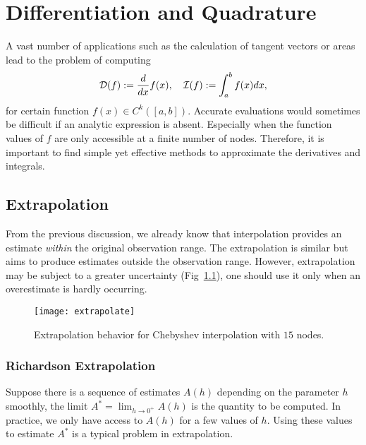 \chapter{Differentiation and Quadrature}
\label{Ch: 3-Dif-Qua}
A vast number of applications such as the calculation of tangent vectors or areas lead to the problem of computing 
\begin{equation}
    \mathcal D(f) := \frac{d}{dx} f(x),\quad \mathcal I(f) := \int_a^b f(x) dx, 
\end{equation}
for certain function $f(x)\in C^k([a, b])$. Accurate evaluations would sometimes be difficult if an analytic expression is absent. Especially when the function values of $f$ are only accessible at a finite number of nodes. Therefore, it is important to find simple yet effective methods to approximate the derivatives and integrals. 

\section{Extrapolation}
\label{Sec: 3-Ext}
From the previous discussion, we already know that interpolation provides an estimate \emph{within} the original observation range. The extrapolation is similar but aims to produce estimates outside the observation range. However, extrapolation may be subject to a greater uncertainty (Fig~\ref{FIG: EXTRAPO}), one should use it only when an overestimate is hardly occurring.
\begin{figure}[!htb]
    \centering
    \texttt{[image: extrapolate]}
    \caption{Extrapolation behavior for Chebyshev interpolation with $15$ nodes.}
    \label{FIG: EXTRAPO}
\end{figure}

\subsection{Richardson Extrapolation}
\label{SSec: 3-Ric-Ext}
Suppose there is a sequence of estimates $A(h)$ depending on the parameter $h$ smoothly, the limit $A^{\ast} = \lim_{h\to 0^{+}} A(h)$ is the quantity to be computed. In practice, we only have access to $A(h)$ for a few values of $h$. Using these values to estimate $A^{\ast}$ is a typical problem in extrapolation. 

